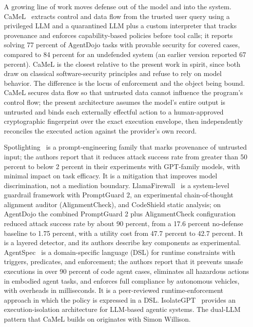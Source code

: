 \documentclass[11pt,letterpaper]{article}
\begin{document}
A growing line of work moves defense out of the model and into the system. CaMeL~\cite{debenedetti2025camel} extracts control and data flow from the trusted user query using a privileged LLM and a quarantined LLM plus a custom interpreter that tracks provenance and enforces capability-based policies before tool calls; it reports solving 77 percent of AgentDojo tasks with provable security for covered cases, compared to 84 percent for an undefended system (an earlier version reported 67 percent). CaMeL is the closest relative to the present work in spirit, since both draw on classical software-security principles and refuse to rely on model behavior. The difference is the locus of enforcement and the object being bound. CaMeL secures data flow so that untrusted data cannot influence the program's control flow; the present architecture assumes the model's entire output is untrusted and binds each externally effectful action to a human-approved cryptographic fingerprint over the exact execution envelope, then independently reconciles the executed action against the provider's own record.

Spotlighting~\cite{hines2024} is a prompt-engineering family that marks provenance of untrusted input; the authors report that it reduces attack success rate from greater than 50 percent to below 2 percent in their experiments with GPT-family models, with minimal impact on task efficacy. It is a mitigation that improves model discrimination, not a mediation boundary. LlamaFirewall~\cite{chennabasappa2025} is a system-level guardrail framework with PromptGuard 2, an experimental chain-of-thought alignment auditor (AlignmentCheck), and CodeShield static analysis; on AgentDojo the combined PromptGuard 2 plus AlignmentCheck configuration reduced attack success rate by about 90 percent, from a 17.6 percent no-defense baseline to 1.75 percent, with a utility cost from 47.7 percent to 42.7 percent. It is a layered detector, and its authors describe key components as experimental. AgentSpec~\cite{wang2025agentspec} is a domain-specific language (DSL) for runtime constraints with triggers, predicates, and enforcement; the authors report that it prevents unsafe executions in over 90 percent of code agent cases, eliminates all hazardous actions in embodied agent tasks, and enforces full compliance by autonomous vehicles, with overheads in milliseconds. It is a peer-reviewed runtime-enforcement approach in which the policy is expressed in a DSL. IsolateGPT~\cite{wu2025isolategpt} provides an execution-isolation architecture for LLM-based agentic systems. The dual-LLM pattern that CaMeL builds on originates with Simon Willison.
\end{document}
